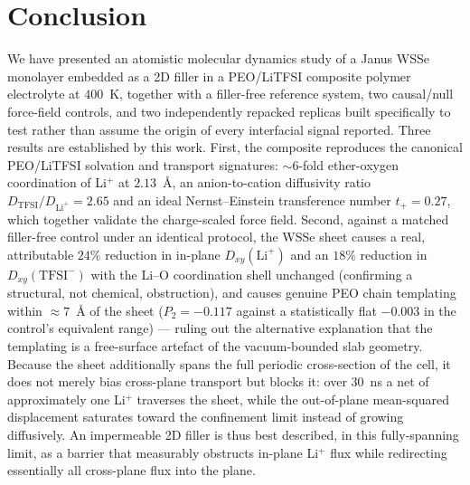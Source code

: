 \documentclass[review, 12pt]{elsarticle}
\numberwithin{equation}{section}
\newcommand{\DLi}{D_{\mathrm{Li}^+}}
\newcommand{\Dxy}{D_{xy}}
\newcommand{\WSSe}{WSSe\xspace}
\newcommand{\LiTFSI}{LiTFSI\xspace}
\begin{document}
\section{Conclusion}\label{sec:conclusion}

We have presented an atomistic molecular dynamics study of a Janus \WSSe monolayer embedded as a 2D filler in a PEO/\LiTFSI composite polymer electrolyte at $400$~K, together with a filler-free reference system, two causal/null force-field controls, and two independently repacked replicas built specifically to test rather than assume the origin of every interfacial signal reported. Three results are established by this work. First, the composite reproduces the canonical PEO/\LiTFSI solvation and transport signatures: $\sim6$-fold ether-oxygen coordination of Li$^+$ at $2.13$~\AA, an anion-to-cation diffusivity ratio $D_{\mathrm{TFSI}}/\DLi = 2.65$ and an ideal Nernst--Einstein transference number $t_+ = 0.27$, which together validate the charge-scaled force field. Second, against a matched filler-free control under an identical protocol, the \WSSe sheet causes a real, attributable $24\%$ reduction in in-plane $\Dxy(\mathrm{Li}^+)$ and an $18\%$ reduction in $D_{xy}(\mathrm{TFSI}^-)$ with the Li--O coordination shell unchanged (confirming a structural, not chemical, obstruction), and causes genuine PEO chain templating within $\approx7$~\AA{} of the sheet ($P_2=-0.117$ against a statistically flat $-0.003$ in the control's equivalent range) --- ruling out the alternative explanation that the templating is a free-surface artefact of the vacuum-bounded slab geometry. Because the sheet additionally spans the full periodic cross-section of the cell, it does not merely bias cross-plane transport but blocks it: over $30$~ns a net of approximately one Li$^+$ traverses the sheet, while the out-of-plane mean-squared displacement saturates toward the confinement limit instead of growing diffusively. An impermeable 2D filler is thus best described, in this fully-spanning limit, as a barrier that measurably obstructs in-plane Li$^+$ flux while redirecting essentially all cross-plane flux into the plane.
\end{document}
